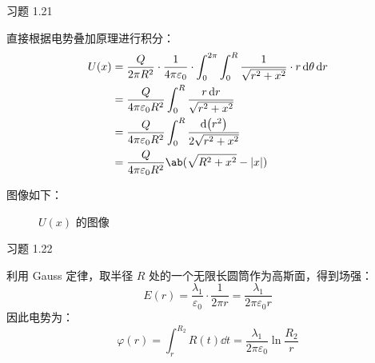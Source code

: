 \begin{problem}
	习题 1.21
	\begin{solution}
		直接根据电势叠加原理进行积分：
		$$
		\begin{aligned}
			U(x) & = \frac{Q}{2\pi R^2} \cdot \frac{1}{4 \pi \varepsilon_0} \cdot \int_{0}^{2\pi} \int_{0}^{R} \frac{1}{\sqrt{r^2 + x^2}} \cdot r \dd{\theta} \dd{r} \\
			& = \frac{Q}{4 \pi \varepsilon_0 R^2} \int_{0}^{R} \frac{r \dd{r}}{\sqrt{r^2 + x^2}} \\
			& = \frac{Q}{4 \pi \varepsilon_0 R^2} \int_{0}^{R} \frac{\dd(r^2)}{2 \sqrt{r^2 + x^2}} \\
			& = \frac{Q}{4 \pi \varepsilon_0 R^2} \ab(\sqrt{R^2 + x^2} - \abs{x})
		\end{aligned}
		$$

		图像如下：
		\begin{figure}[H]
			\centering
			\caption{$U(x)$ 的图像}
		\end{figure}
	\end{solution}
\end{problem}

\begin{problem}
	习题 1.22
	\begin{solution}
		利用 Gauss 定律，取半径 $R$ 处的一个无限长圆筒作为高斯面，得到场强：
		$$
		E(r) = \frac{\lambda_1}{\varepsilon_0} \cdot \frac{1}{2 \pi r} = \frac{\lambda_1}{2 \pi \varepsilon_0 r}
		$$
		因此电势为：
		$$
		\varphi(r) = \int_{r}^{R_2} R(t) \dd{t} = \frac{\lambda_1}{2\pi \varepsilon_0} \ln \frac{R_2}{r}
		$$
	\end{solution}
\end{problem}

